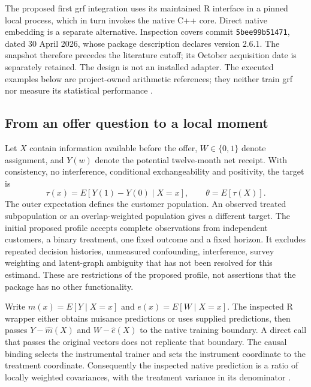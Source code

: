 The proposed first grf integration uses its maintained R interface in a
pinned local process, which in turn invokes the native C++ core. Direct
native embedding is a separate alternative. Inspection covers commit
\texttt{5bee99b51471}, dated 30 April 2026, whose package description
declares version 2.6.1. The snapshot therefore precedes the literature
cutoff; its October acquisition date is separately retained. The design
is not an installed adapter. The executed examples below are
project-owned arithmetic references; they neither train grf nor measure
its statistical performance
\citep{exec13_grf_runtime,exec13_grf_design,exec13_grf_oracle}.

\subsection{From an offer question to a local moment}

Let \(X\) contain information available before the offer,
\(W\in\{0,1\}\) denote assignment, and \(Y(w)\) denote the potential
twelve-month net receipt. With consistency, no interference, conditional
exchangeability and positivity, the target is \[
 \tau(x)=E[Y(1)-Y(0)\mid X=x],\qquad
 \theta=E[\tau(X)].
\] The outer expectation defines the customer population. An observed
treated subpopulation or an overlap-weighted population gives a
different target. The initial proposed profile accepts complete
observations from independent customers, a binary treatment, one fixed
outcome and a fixed horizon. It excludes repeated decision histories,
unmeasured confounding, interference, survey weighting and latent-graph
ambiguity that has not been resolved for this estimand. These are
restrictions of the proposed profile, not assertions that the package
has no other functionality.

Write \(m(x)=E[Y\mid X=x]\) and \(e(x)=E[W\mid X=x]\). The inspected R
wrapper either obtains nuisance predictions or uses supplied
predictions, then passes \(Y-\widehat m(X)\) and \(W-\widehat e(X)\) to
the native training boundary. A direct call that passes the original
vectors does not replicate that boundary. The causal binding selects the
instrumental trainer and sets the instrument coordinate to the treatment
coordinate. Consequently the inspected native prediction is a ratio of
locally weighted covariances, with the treatment variance in its
denominator \citep{exec13_grf_rpath,exec13_grf_native}.

